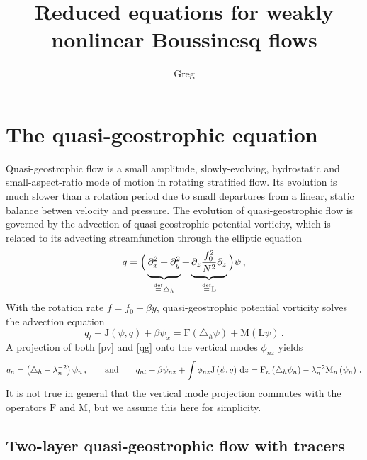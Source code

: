 \documentclass[12pt, oneside]{article}
\newcommand*\mystrut[1]{\vrule width0pt height0pt depth#1\relax}
\newcommand{\com}{\, ,}
\newcommand{\per}{\, .}
\newcommand{\defn}{\ensuremath{\stackrel{\mathrm{def}}{=}}}
\newcommand{\beq}{\begin{equation}}
\newcommand{\eeq}{\end{equation}}
\newcommand{\p}{\partial}
\newcommand{\hlap}{\triangle_h}
\newcommand{\id}{{\, \rm d}}
\newcommand{\J}{\mathrm{J}}
\renewcommand{\L}{\mathrm{L}}
\newcommand{\friction}{\mathrm{F}}
\newcommand{\mixing}{\mathrm{M}}
\begin{document}
\title{\vspace{-4ex} Reduced equations for weakly nonlinear Boussinesq flows}
\author{Greg}
\date{} \maketitle \vspace{-4ex}

\section{The quasi-geostrophic equation}

Quasi-geostrophic flow is a small amplitude, slowly-evolving, hydrostatic and small-aspect-ratio mode of motion in rotating stratified flow. Its evolution is much slower than a rotation period due to small departures from a linear, static balance betwen velocity and pressure. The evolution of quasi-geostrophic flow is governed by the advection of quasi-geostrophic potential vorticity, which is related to its advecting streamfunction through the elliptic equation
\beq
q = \Big ( \underbrace{\mystrut{2ex} \p_x^2 + \p_y^2}_{\defn \hlap} + \underbrace{\mystrut{2ex} \p_z \frac{f_0^2}{N^2} \p_z}_{\defn \L} \Big ) \psi \com
\label{pv}
\eeq
With the rotation rate $f = f_0 + \beta y$, quasi-geostrophic potential vorticity solves the advection equation
\beq
q_t + \J \left ( \psi, q \right ) + \beta \psi_x = \friction \left ( \hlap \psi \right ) + \mixing \left ( \L \psi \right ) \per
\label{qg}
\eeq
A projection of both \eqref{pv} and \eqref{qg} onto the vertical modes $\phi_{nz}$ yields
\beq
q_n = \left ( \hlap - \lambda_n^{-2} \right ) \psi_n \com \qquad \text{and} \qquad q_{nt} + \beta \psi_{nx} + \int \phi_{nz} \J \left ( \psi, q \right ) \id z = \friction_n \left ( \hlap \psi_n \right) - \lambda_n^{-2} \mixing_n \left ( \psi_n \right ) \per
\eeq
It is not true in general that the vertical mode projection commutes with the operators $\friction$ and $\mixing$, but we assume this here for simplicity.

\subsection{Two-layer quasi-geostrophic flow with tracers}
\end{document}
